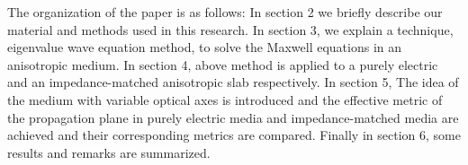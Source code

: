 \documentclass[9pt,twocolumn,twoside]{osajnl}
\begin{document}
The organization of the paper is as follows: In section 2 we briefly describe our material and methods used in this research. In section 3, we explain a technique, eigenvalue wave equation method,  to solve the Maxwell equations in an  anisotropic medium. 
In section 4, above method is applied to a purely electric and an impedance-matched anisotropic slab respectively. 
In section 5, The idea of the medium with variable optical axes is introduced and the effective metric of the propagation plane  in purely electric media and impedance-matched media are achieved and their corresponding metrics are compared. 
Finally in section 6, some results and remarks are summarized. 




\end{document}
